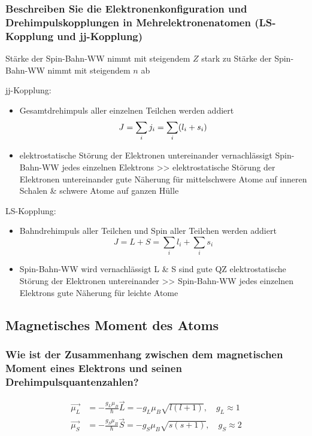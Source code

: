 \subsubsection{Beschreiben Sie die Elektronenkonfiguration und Drehimpulskopplungen in Mehrelektronenatomen (LS-Kopplung und jj-Kopplung)}
\begin{itemize}
    \to Stärke der Spin-Bahn-WW nimmt mit steigendem $Z$ stark zu
    \to Stärke der Spin-Bahn-WW nimmt mit steigendem $n$ ab
\end{itemize}
jj-Kopplung:
\begin{itemize}
    \item Gesamtdrehimpuls aller einzelnen Teilchen werden addiert
    \begin{equation*}
        J=\sum_i j_i=\sum_i(l_i+s_i)\\
    \end{equation*}
    \item elektrostatische Störung der Elektronen untereinander vernachlässigt
    \to Spin-Bahn-WW jedes einzelnen Elektrons >> elektrostatische Störung der Elektronen untereinander
    \iff gute Näherung für mittelschwere Atome auf inneren Schalen & schwere Atome auf ganzen Hülle
\end{itemize}
LS-Kopplung: 
\begin{itemize}
    \item Bahndrehimpuls aller Teilchen und Spin aller Teilchen werden addiert
        \begin{equation*}
            J=L+S=\sum_il_i + \sum_i s_i
        \end{equation*}
    \item Spin-Bahn-WW wird vernachlässigt \iff L & S sind gute QZ 
    \to elektrostatische Störung der Elektronen untereinander >> Spin-Bahn-WW jedes einzelnen Elektrons
    \to gute Näherung für leichte Atome
\end{itemize}


\subsection{Magnetisches Moment des Atoms}

\subsubsection{Wie ist der Zusammenhang zwischen dem magnetischen Moment eines Elektrons und seinen Drehimpulsquantenzahlen?}
\begin{align*}
    \vec{\mu_L}&=-\frac{g_L\mu_B}{\hbar}\vec{L}=-g_L\mu_B\sqrt{l(l+1)}, \quad g_L\approx 1\\
    \vec{\mu_S}&=-\frac{g_S\mu_B}{\hbar}\vec{S}=-g_S\mu_B\sqrt{s(s+1)}, \quad g_S\approx 2
\end{align*}
